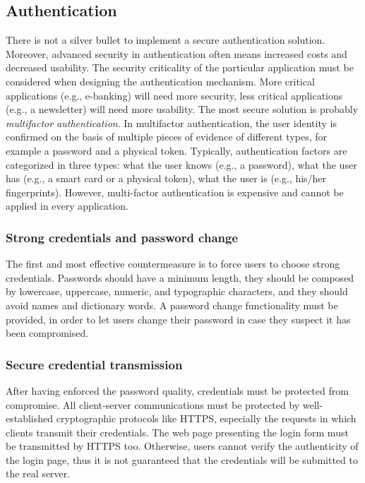 \documentclass[a4paper,12pt]{article}
\begin{document}
\subsection{Authentication}
There is not a silver bullet to implement a secure authentication solution. Moreover, advanced security in authentication often means increased costs and decreased usability. The security criticality of the particular application must be considered when designing the authentication mechanism. More critical applications (e.g., e-banking) will need more security, less critical applications (e.g., a newsletter) will need more usability. The most secure solution is probably \textit{multifactor authentication}. In multifactor authentication, the user identity is confirmed on the basis of multiple pieces of evidence of different types, for example a password and a physical token. Typically, authentication factors are categorized in three types: what the user knows (e.g., a password), what the user has (e.g., a smart card or a physical token), what the user is (e.g., his/her fingerprints). However, multi-factor authentication is expensive and cannot be applied in every application.

\subsubsection{Strong credentials and password change}
The first and most effective countermeasure is to force users to choose strong credentials. Passwords should have a minimum length, they should be composed by lowercase, uppercase, numeric, and typographic characters, and they should avoid names and dictionary words. A password change functionality must be provided, in order to let users change their password in case they suspect it has been compromised.

\subsubsection{Secure credential transmission}
After having enforced the password quality, credentials must be protected from compromise. All client-server communications must be protected by well-established cryptographic protocols like HTTPS, especially the requests in which clients transmit their credentials. The web page presenting the login form must be transmitted by HTTPS too. Otherwise, users cannot verify the authenticity of the login page, thus it is not guaranteed that the credentials will be submitted to the real server.
\end{document}
